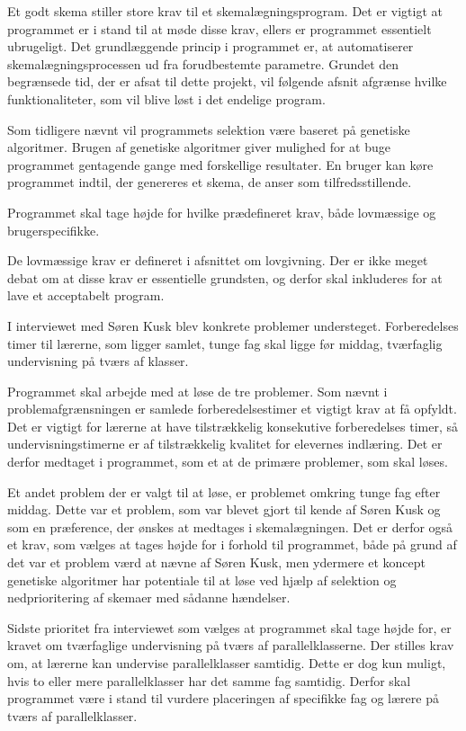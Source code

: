 Et godt skema stiller store krav til et skemalægningsprogram. Det er vigtigt at programmet er i stand til at møde disse krav, ellers er programmet essentielt ubrugeligt. Det grundlæggende princip i programmet er, at automatiserer skemalægningsprocessen ud fra forudbestemte parametre. Grundet den begrænsede tid, der er afsat til dette projekt, vil følgende afsnit afgrænse hvilke funktionaliteter, som vil blive løst i det endelige program.

Som tidligere nævnt vil programmets selektion være baseret på genetiske algoritmer. Brugen af genetiske algoritmer giver mulighed for at buge programmet gentagende gange med forskellige resultater. En bruger kan køre programmet indtil, der genereres et skema, de anser som tilfredsstillende.

Programmet skal tage højde for hvilke prædefineret krav, både lovmæssige og brugerspecifikke.

De lovmæssige krav er defineret i afsnittet om lovgivning. Der er ikke meget debat om at disse krav er essentielle grundsten, og derfor skal inkluderes for at lave et acceptabelt program. 

I interviewet med Søren Kusk blev konkrete problemer understeget. Forberedelses timer til lærerne, som ligger samlet, tunge fag skal ligge før middag, tværfaglig undervisning på tværs af klasser.

Programmet skal arbejde med at løse de tre problemer. Som nævnt i problemafgrænsningen er samlede forberedelsestimer et vigtigt krav at få opfyldt. Det er vigtigt for lærerne at have tilstrækkelig konsekutive forberedelses timer, så undervisningstimerne er af tilstrækkelig kvalitet for elevernes indlæring. Det er derfor medtaget i programmet, som et at de primære problemer, som skal løses. 

Et andet problem der er valgt til at løse, er problemet omkring tunge fag efter middag. Dette var et problem, som var blevet gjort til kende af Søren Kusk og som en præference, der ønskes at medtages i skemalægningen. Det er derfor også et krav, som vælges at tages højde for i forhold til programmet, både på grund af det var et problem værd at nævne af Søren Kusk, men ydermere et koncept genetiske algoritmer har potentiale til at løse ved hjælp af selektion og nedprioritering af skemaer med sådanne hændelser.

Sidste prioritet fra interviewet som vælges at programmet skal tage højde for, er kravet om tværfaglige undervisning på tværs af parallelklasserne. Der stilles krav om, at lærerne kan undervise parallelklasser samtidig. Dette er dog kun muligt, hvis to eller mere parallelklasser har det samme fag samtidig. Derfor skal programmet være i stand til vurdere placeringen af specifikke fag og lærere på tværs af parallelklasser. 

